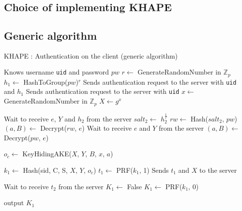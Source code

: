 \documentclass[../report.tex]{subfiles}
\begin{document}
\chapter{}

\section{Choice of implementing KHAPE}

\section{Generic algorithm}


\begin{algorithm}
\caption{KHAPE : Authentication on the client (generic algorithm)}
\label{login_client}
\begin{algorithmic}
\Require Knows username \verb|uid| and password $pw$
    \State $r \gets$ GenerateRandomNumber in $\mathbb{Z}_p$
    \State $h_1 \gets$ HashToGroup($pw$)$^r$
    \State Sends authentication request to the server with \verb|uid| and $h_1$
\Else
    \State Sends authentication request to the server with \verb|uid|
\EndIf
\State $x \gets$ GenerateRandomNumber in $\mathbb{Z}_p$
\State $X \gets g^x$

    \State Wait to receive $e$, $Y$ and $h_2$ from the server
    \State $salt_2 \gets$ $h_2^{\frac{1}{r}}$
    \State $rw \gets$ Hash($salt_2$, $pw$)
    \State $(a, B) \gets$ Decrypt($rw$, $e$)
\Else
    \State Wait to receive $e$ and $Y$ from the server
    \State $(a, B) \gets$ Decrypt($pw$, $e$)
\EndIf



\State $o_c \gets$ KeyHidingAKE($X$, $Y$, $B$, $x$, $a$)

\State $k_1 \gets$ Hash(sid, C, S, $X$, $Y$, $o_c$)
\State $t_1 \gets$ PRF($k_1$, 1)
\State Sends $t_1$ and $X$ to the server


\State Wait to receive $t_2$ from the server
    \State $K_1 \gets$ False
\Else
    \State $K_1 \gets$ PRF($k_1$, 0)
\EndIf

\State output $K_1$
\end{algorithmic}
\end{algorithm}
\end{document}
